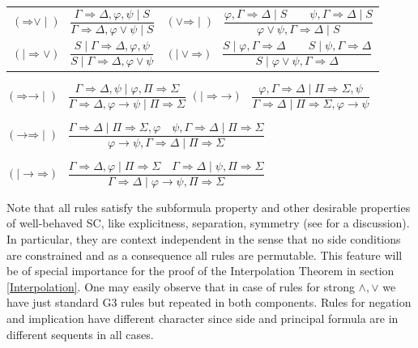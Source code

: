 \documentclass[11pt,a4paper,titlepage]{article}
\theoremstyle{definition}
\newcommand{\3}{\vspace{.3in}}
\newcommand{\2}{\vspace{.2in}}
\newcommand{\1}{\vspace{.1in}}
\newcommand{\5}{\vspace{.05in}}
\begin{document}
\noindent\begin{tabular}{ll}	
	
 $(\mathord{\Rightarrow}\mathord{\vee}\mid)$ \ $\dfrac{\Gamma
		\Rightarrow \Delta, \varphi,\psi \mid S} {\Gamma\Rightarrow \Delta,
		\varphi\vee\psi \mid S}$ &
	 $(\mathord{\vee}\mathord{\Rightarrow}\mid)$ \ $\dfrac{\varphi, \Gamma
		\Rightarrow \Delta \mid S \qquad \psi, \Gamma
		\Rightarrow \Delta \mid S}{\varphi\vee\psi,
		\Gamma\Rightarrow \Delta \mid S}$\\[16pt]
	
	
	 $(\mathord{\mid\Rightarrow}\mathord{\vee})$ \ $\dfrac{S\mid\Gamma
		\Rightarrow \Delta, \varphi,\psi } {S\mid\Gamma\Rightarrow \Delta,
		\varphi\vee\psi}$ &
 $(\mathord{\mid\vee}\mathord{\Rightarrow})$ \ $\dfrac{S\mid\varphi, \Gamma
		\Rightarrow \Delta \qquad S\mid \psi, \Gamma
		\Rightarrow \Delta }{S\mid\varphi\vee\psi,
		\Gamma \Rightarrow \Delta}$\\[16pt]	
\end{tabular}
\begin{flushleft}
	$(\mathord{\Rightarrow}\mathord{\rightarrow}\mid)$ \, $\dfrac{\Gamma
		\Rightarrow \Delta, \psi \mid \varphi, \Pi\Rightarrow\Sigma}{\Gamma\Rightarrow\Delta, \varphi\rightarrow\psi \mid \Pi\Rightarrow\Sigma}$\qquad
	$(\mathord{\mid\Rightarrow}\mathord{\rightarrow})$ \, $\dfrac{\varphi, \Gamma
		\Rightarrow \Delta \mid\Pi\Rightarrow\Sigma, \psi}{\Gamma\Rightarrow\Delta \mid \Pi\Rightarrow\Sigma, \varphi\rightarrow\psi}$	
\end{flushleft}
\begin{flushleft}
	$(\mathord{\rightarrow}\mathord{\Rightarrow}\mid)$ \, $\dfrac{\Gamma
		\Rightarrow \Delta \mid \Pi\Rightarrow\Sigma, \varphi \quad\psi, \Gamma\Rightarrow\Delta \mid
		\Pi \Rightarrow \Sigma } {\varphi\rightarrow\psi, \Gamma
		\Rightarrow \Delta \mid \Pi\Rightarrow\Sigma}$
\end{flushleft}
\begin{flushleft}
$(\mathord{\mid\rightarrow}\mathord{\Rightarrow})$ \, $\dfrac{\Gamma
	\Rightarrow \Delta, \varphi \mid \Pi\Rightarrow\Sigma \quad \Gamma\Rightarrow\Delta \mid \psi,
	\Pi \Rightarrow \Sigma } {\Gamma
	\Rightarrow \Delta \mid \varphi\rightarrow\psi, \Pi\Rightarrow\Sigma}$	
\end{flushleft}

Note that all rules satisfy the subformula property and other desirable properties of well-behaved SC, like explicitness, separation, symmetry (see \cite{Poggiolesi,Wansing, Indrzejczak2} for a discussion). In particular, they are context independent in the sense that no side conditions are constrained and as a consequence all rules are permutable. This feature will be of special importance for the proof of the Interpolation Theorem in section \ref{Interpolation}. One may easily observe that in case of rules for strong $\wedge, \vee$ we have just standard G3 rules but repeated in both components. Rules for negation and implication have different character since side and principal formula are in different sequents in all cases.
\end{document}

